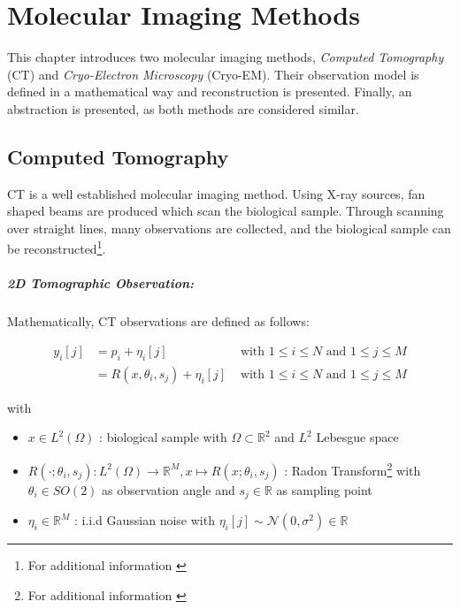 \chapter{Molecular Imaging Methods}
\label{sec:imaging}

This chapter introduces two molecular imaging methods, \textit{Computed Tomography} (CT) and 
\textit{Cryo-Electron Microscopy} (Cryo-EM). Their observation model is defined in a mathematical way and reconstruction is presented.
Finally, an abstraction is presented, as both methods are considered similar.




\section{Computed Tomography}
CT is a well established molecular imaging method.
Using X-ray sources, fan shaped beams are produced which scan the biological sample.
Through scanning over straight lines, many observations are collected, 
and the biological sample can be reconstructed\footnote{For additional information \cite{computedTomography}}.

\paragraph{2D Tomographic Observation:}

Mathematically, CT observations are defined as follows:

\begin{equation}
    \label{eq:2Dreconstruction}
    \begin{aligned}
        y_i[j] &= p_i + \eta_i[j] & \text{ with } 1 \leq i \leq N \text{ and } 1 \leq j \leq M \\
               &= R(x, \theta_i, s_j) + \eta_i[j] & \text{ with } 1 \leq i \leq N \text{ and } 1 \leq j \leq M
    \end{aligned}
\end{equation}

with
\begin{itemize}
    \item $x \in L^2(\Omega)$ : biological sample with $\Omega \subset \mathbb{R}^2 $ and $L^2$ Lebesgue space
    \item $R(\cdot; \theta_i, s_j): L^2(\Omega) \to \mathbb{R}^M , x \mapsto R(x; \theta_i, s_j)$ : Radon Transform\footnote{For additional information \cite{radonTransform}} 
        with $\theta_i \in SO(2)$ as observation angle and $s_j \in \mathbb{R}$ as sampling point
    \item $\eta_i \in \mathbb{R}^M$ : i.i.d Gaussian noise with $\eta_i[j] \sim \mathcal{N}(0,\sigma^2) \in \mathbb{R}$
\end{itemize}



